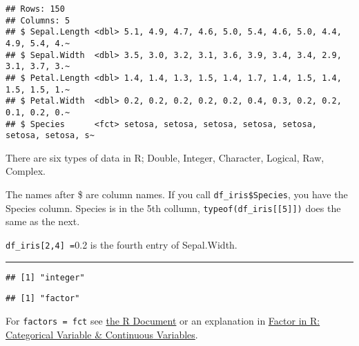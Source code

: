 \documentclass[
]{article}
\newenvironment{Shaded}{\begin{snugshade}}{\end{snugshade}}
\newcommand{\FunctionTok}[1]{\textcolor[rgb]{0.00,0.00,0.00}{#1}}
\newcommand{\NormalTok}[1]{#1}
\newcommand{\SpecialCharTok}[1]{\textcolor[rgb]{0.00,0.00,0.00}{#1}}
\begin{document}
\begin{verbatim}
## Rows: 150
## Columns: 5
## $ Sepal.Length <dbl> 5.1, 4.9, 4.7, 4.6, 5.0, 5.4, 4.6, 5.0, 4.4, 4.9, 5.4, 4.~
## $ Sepal.Width  <dbl> 3.5, 3.0, 3.2, 3.1, 3.6, 3.9, 3.4, 3.4, 2.9, 3.1, 3.7, 3.~
## $ Petal.Length <dbl> 1.4, 1.4, 1.3, 1.5, 1.4, 1.7, 1.4, 1.5, 1.4, 1.5, 1.5, 1.~
## $ Petal.Width  <dbl> 0.2, 0.2, 0.2, 0.2, 0.2, 0.4, 0.3, 0.2, 0.2, 0.1, 0.2, 0.~
## $ Species      <fct> setosa, setosa, setosa, setosa, setosa, setosa, setosa, s~
\end{verbatim}

There are six types of data in R; Double, Integer, Character, Logical,
Raw, Complex.

The names after \$ are column names. If you call
\texttt{df\_iris\$Species}, you have the Species column. Species is in
the 5th collumn, \texttt{typeof(df\_iris{[}{[}5{]}{]})} does the same as
the next.

\texttt{df\_iris{[}2,4{]}\ =}0.2 is the fourth entry of Sepal.Width.

\begin{center}\rule{0.5\linewidth}{0.5pt}\end{center}

\begin{Shaded}
\end{Shaded}

\begin{verbatim}
## [1] "integer"
\end{verbatim}

\begin{Shaded}
\end{Shaded}

\begin{verbatim}
## [1] "factor"
\end{verbatim}

For \texttt{factors\ =\ fct} see
\href{https://www.rdocumentation.org/packages/base/versions/3.6.2/topics/factor}{the
R Document} or an explanation in
\href{https://www.guru99.com/r-factor-categorical-continuous.html}{Factor
in R: Categorical Variable \& Continuous Variables}.
\end{document}
